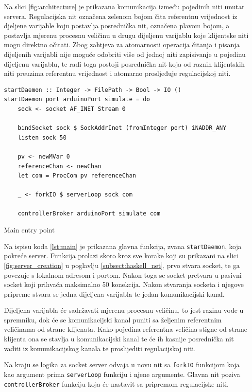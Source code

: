 Na slici \ref{fig:architecture} je prikazana komunikacija između pojedinih niti
unutar servera. Regulacijska nit označena zelenom bojom čita referentnu
vrijednost iz djeljene varijable koju postavlja posrednička nit, označena plavom
bojom, a postavlja mjerenu procesnu veličinu u drugu dijeljenu varijablu koje
klijentske niti mogu direktno očitati. Zbog zahtjeva za atomarnosti operacija
čitanja i pisanja dijeljenih varijabli nije moguće odobriti više od jednoj niti
zapisivanje u pojedinu dijeljenu varijablu, te radi toga postoji posrednička nit
koja od raznih klijentskih niti preuzima referentnu vrijednost i atomarno
prosljeđuje regulacijskoj niti.

\begin{listing}[H]
\centering
\begin{verbatim}
startDaemon :: Integer -> FilePath -> Bool -> IO ()
startDaemon port arduinoPort simulate = do
    sock <- socket AF_INET Stream 0

    bindSocket sock $ SockAddrInet (fromInteger port) iNADDR_ANY
    listen sock 50

    pv <- newMVar 0
    referenceChan <- newChan
    let com = ProcCom pv referenceChan

    _ <- forkIO $ serverLoop sock com

    controllerBroker arduinoPort simulate com
\end{verbatim}
\caption{Main entry point}
\label{lst:main}
\end{listing}

Na ispisu koda \ref{lst:main} je prikazana glavna funkcija, zvana
\texttt{startDaemon}, koja pokreće server.
Funkcija prolazi skoro kroz sve korake koji su prikazani na slici
\ref{fig:server_creation} u poglavlju \ref{subsect:haskell_net}, prvo stvara
socket, te ga povezuje s lokalnom adresom i portom. Nakon toga se socket
pretvara u pasivni socket koji prihvaća maksimalno 50 konekcija. Nakon stvaranja
socketa i njegove pripreme stvara se jedna dijeljena varijabla te jedan
komunikacijski kanal.

Dijeljena varijabla će sadržavati mjerenu procesnu veličinu, to jest razinu vode
u spremniku, dok će se komunikacijski kanal puniti sa željenim referentnim
veličinama od strane klijenata. Kako pojedina referentna veličina stigne od
strane klijenta ona se stavlja u komunikacijski kanal te će ih kasnije
posrednička nit vaditi iz komunikacijskog kanala te proslijediti
regulacijskoj niti.

Na kraju se logika za socket server odvaja u novu nit sa
\texttt{forkIO} funkcijom koja kao argument prima
\texttt{serverLoop} funkciju i njene argumente. Glavna nit poziva
\texttt{controllerBroker} funkciju koja će nastavit sa pripremom
regulacijske niti.

